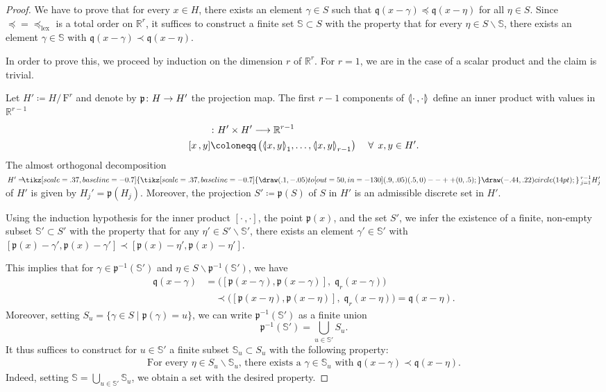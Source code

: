 \documentclass[AHL,Unicode,longabstracts]{cedram}
\newcommand{\symbuptm}{\tikz[scale=.37, baseline=-0.7]{\draw(.1,-.05)to[out=50,in=-130](.9,.05) (.5,0)--++(0,.5);}}
\newcommand{\almorth}{\tikz[scale=.37, baseline=-0.7]{\symbuptm \draw (-.44,.22) circle (14pt);}}
\newcommand{\aplus}{\hspace{-.2cm}\almorth\,}
\newcommand{\llangle}{\mathopen{\langle\mkern -3.1mu\lvert}}
\newcommand{\rrangle}{\mathclose{\rvert\mkern -3.1mu\rangle}}
\newcommand{\highinn}[2]{{\llangle#2\rrangle_{#1}}}
\newcommand{\rquot}[2]{#1/\,#2}
\newcommand{\filter}{\mathrm{F}}
\newcommand{\R}{\mathbb{R}}
\renewcommand{\S}{\mathbb{S}}
\newcommand{\proj}{\mathfrak{p}}
\newcommand{\qf}{\mathfrak{q}}
\renewcommand{\setminus}{\smallsetminus}
\newcommand{\lexeq}{\preceq_{\mathrm{lex}}}
\renewcommand*{\to}{\mathchoice{\longrightarrow}{\rightarrow}{\rightarrow}{\rightarrow}}
\let\oldforall\forall
\renewcommand*{\forall}{\mathrel{\oldforall}}
\begin{document}
\begin{proof}
We have to prove that for every $x \in H$, there exists an element $\gamma \in S$ such that $\qf(x-\gamma) \preceq \qf(x-\eta)$ for all $\eta \in S$. Since $\preceq=\lexeq$ is a total order on $\R^r$, it suffices to construct a finite set $\S \subset S$ with the property that for every $\eta \in S \setminus \S$, there exists an element $\gamma \in \S$ with $\qf(x-\gamma) \prec \qf(x-\eta)$.

In order to prove this, we proceed by induction on the dimension $r$ of $\R^r$. For $r = 1$, we are in the case of a scalar product and the claim is trivial.



Let $H'\coloneqq \rquot{H}{\filter^r}$ and denote by $\proj \colon H \to H'$ the projection map. The first $r-1$ components of $\highinn{}{\cdot \,, \cdot}$ define an inner product with values in $\R^{r-1}$
\begin{align*}
[\cdot \,, \cdot]&\colon H' \times H' \to \R^{r-1}\\
[x \,, y] &\coloneqq \left(\highinn{1}{x, y}, \dots, \highinn{r-1}{x, y}\right) \quad \forall\, x, y \in H'.
\end{align*}
The almost orthogonal decomposition $H'= \aplus_{j=1}^{r-1} H_j'$ of $H'$ is given by $H_j' = \proj(H_j)$. Moreover, the projection $S ' \coloneqq \proj(S)$ of $S$ in $H'$ is an admissible discrete set in $H'$.

Using the induction hypothesis for the inner product $[\cdot \,, \cdot]$, the point $\proj(x)$, and the set $S'$, we infer the existence of a finite, non-empty subset $\S' \subset S'$ with the property that for any $\eta' \in S' \setminus \S'$, there exists an element $\gamma' \in \S'$ with $[\proj(x)-\gamma', \proj(x)-\gamma'] \prec [\proj(x)-\eta', \proj(x)-\eta'] $.


This implies that for $\gamma \in \proj^{-1}(\S')$ and $\eta \in S \setminus \proj^{-1}(\S')$, we have
\begin{align*}
\qf(x - \gamma) &= \Big([\proj(x - \gamma), \proj(x - \gamma)], \;\qf_r(x - \gamma)\Big) \\
&\quad\prec \Big([\proj(x - \eta), \proj(x-\eta)],\; \qf_r(x - \eta) \Big) = \qf(x - \eta).
\end{align*}
Moreover, setting $S_u = \{\gamma \in S \mid \proj(\gamma) =u\}$, we can write $\proj^{-1}(\S')$ as a finite union
\[
\proj^{-1}(\S') = \bigcup_{u \in \S'} S_u.
\]
It thus suffices to construct for $u \in \S'$ a finite subset $\S_u \subset S_u$ with the following property:
\begin{align}\label{eq:prop-finiteness}
\text{For every $\eta \in S_u \setminus \S_u$, there exists a $\gamma \in \S_u$ with $\qf(x - \gamma) \prec \qf(x - \eta)$.}
\end{align}
Indeed, setting $\S = \bigcup_{u \in \S'} \S_u$, we obtain a set with the desired property.



\end{proof}
\end{document}
